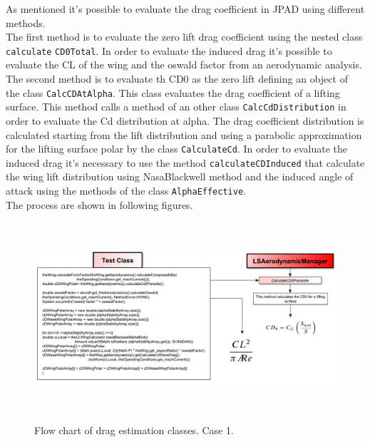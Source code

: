 As mentioned it's possible to evaluate the drag coefficient in JPAD using different methods. \\
The first method is to evaluate the zero lift drag coefficient using the nested class \texttt{calculate} \texttt{CD0Total}. In order to evaluate the induced drag it's possible to evaluate the CL of the wing and the oswald factor from an aerodynamic analysis.\\
The second method is to evaluate th CD0 as the zero lift defining an object of the class  \texttt{CalcCDAtAlpha}. This class evaluates the drag coefficient of a lifting surface. This method calls a method of an other class \texttt{CalcCdDistribution} in order to evaluate the Cd distribution at alpha. The drag coefficient distribution is calculated starting from the lift distribution and using a parabolic approximation for the lifting surface polar by the class \texttt{CalculateCd}.  In order to evaluate the induced drag it's necessary to use the method \texttt{calculateCDInduced} that calculate the wing lift distribution using NasaBlackwell method and the induced angle of attack using the methods of the class \texttt{AlphaEffective}.\\
The process are shown in following figures.
\noindent\\
\begin{figure}[H]
\centering
{\includegraphics[height=7cm,  angle=90]{immagini/dragflowchartcd0.pdf}}
\caption{Flow chart of drag estimation classes. Case 1.}
\label{fig:cd}
\end{figure}

